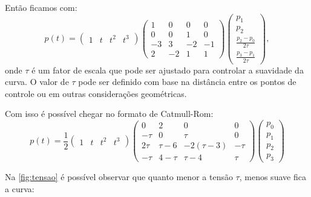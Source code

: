 Então ficamos com:
\begin{equation}
    p(t) =  
        \left(
        \begin{array}{rrrr}
            1 & t & t^2 & t^3
        \end{array}
        \right)
        \left(
        \begin{array}{rrrr}
            1 & 0 & 0 & 0 \\
            0 & 0 & 1 & 0 \\
            -3 & 3 & -2 & -1 \\
                2 & -2 & 1 & 1
        \end{array}
        \right)
    \left(
        \begin{array}{r}
            p_1 \\
            p_2 \\
            \frac{p_2 - p_0}{2\tau} \\
                \frac{p_3 - p_1}{2\tau}
        \end{array}
        \right),
\end{equation}
onde $\tau$ é um fator de escala que pode ser ajustado para controlar a suavidade da curva. O valor de $\tau$ pode ser definido com base na distância entre os pontos de controle ou em outras considerações geométricas.

Com isso é possível chegar no formato de Catmull-Rom:
\begin{equation}
    p(t) = \frac{1}{2}
       \left(
 	\begin{array}{rrrr}
 		1 & t & t^2 & t^3
 	\end{array}
    \right)
    \left(
 	\begin{array}{rrrr}
 		0 & 2 & 0 & 0 \\
 	    -\tau & 0 & \tau & 0 \\
 		2\tau & \tau-6 & -2(\tau-3) & -\tau \\
            -\tau & 4-\tau & \tau-4 & \tau
 	\end{array}
    \right)
   \left(
 	\begin{array}{r}
 		p_0 \\
 	    p_1 \\
 		p_2 \\
            p_3
 	\end{array}
    \right)
\end{equation}

Na \autoref{fig:tensao} é possível observar que quanto menor a tensão $\tau$, menos suave fica a curva:

